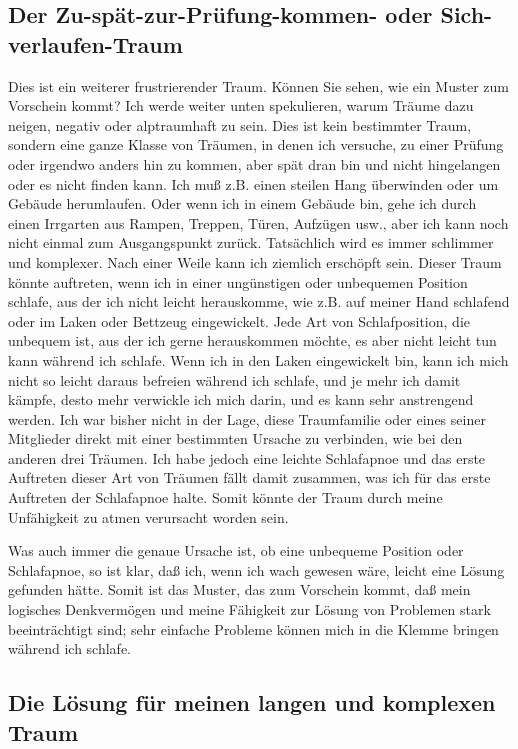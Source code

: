 \subsection{Der Zu-spät-zur-Prüfung-kommen- oder Sich-verlaufen-Traum}
\label{c3_5d}

Dies ist ein weiterer frustrierender Traum.
Können Sie sehen, wie ein Muster zum Vorschein kommt?
Ich werde weiter unten spekulieren, warum Träume dazu neigen, negativ oder alptraumhaft zu sein.
Dies ist kein bestimmter Traum, sondern eine ganze Klasse von Träumen, in denen ich versuche, zu einer Prüfung oder irgendwo anders hin zu kommen, aber spät dran bin und nicht hingelangen oder es nicht finden kann.
Ich muß z.B. einen steilen Hang überwinden oder um Gebäude herumlaufen.
Oder wenn ich in einem Gebäude bin, gehe ich durch einen Irrgarten aus Rampen, Treppen, Türen, Aufzügen usw., aber ich kann noch nicht einmal zum Ausgangspunkt zurück.
Tatsächlich wird es immer schlimmer und komplexer.
Nach einer Weile kann ich ziemlich erschöpft sein.
Dieser Traum könnte auftreten, wenn ich in einer ungünstigen oder unbequemen Position schlafe, aus der ich nicht leicht herauskomme, wie z.B. auf meiner Hand schlafend oder im Laken oder Bettzeug eingewickelt.
Jede Art von Schlafposition, die unbequem ist, aus der ich gerne herauskommen möchte, es aber nicht leicht tun kann während ich schlafe.
Wenn ich in den Laken eingewickelt bin, kann ich mich nicht so leicht daraus befreien während ich schlafe, und je mehr ich damit kämpfe, desto mehr verwickle ich mich darin, und es kann sehr anstrengend werden.
Ich war bisher nicht in der Lage, diese Traumfamilie oder eines seiner Mitglieder direkt mit einer bestimmten Ursache zu verbinden, wie bei den anderen drei Träumen.
Ich habe jedoch eine leichte Schlafapnoe und das erste Auftreten dieser Art von Träumen fällt damit zusammen, was ich für das erste Auftreten der Schlafapnoe halte.
Somit könnte der Traum durch meine Unfähigkeit zu atmen verursacht worden sein.

Was auch immer die genaue Ursache ist, ob eine unbequeme Position oder Schlafapnoe, so ist klar, daß ich, wenn ich wach gewesen wäre, leicht eine Lösung gefunden hätte.
Somit ist das Muster, das zum Vorschein kommt, daß mein logisches Denkvermögen und meine Fähigkeit zur Lösung von Problemen stark beeinträchtigt sind; sehr einfache Probleme können mich in die Klemme bringen während ich schlafe.
 

\subsection{Die Lösung für meinen langen und komplexen Traum}
\label{c3_5e}

